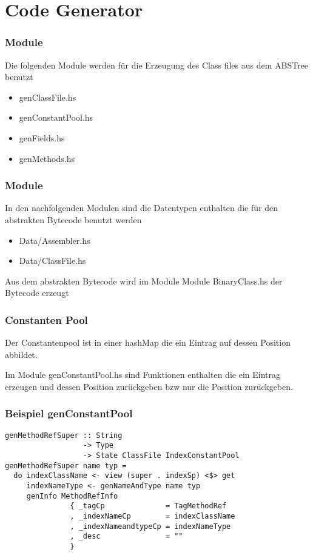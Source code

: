 \section{Code Generator}

\begin{frame}
        \frametitle{Module}
        Die folgenden Module werden für die Erzeugung des Class files aus dem ABSTree benutzt
        \begin{itemize}
                \item genClassFile.hs
                \item genConstantPool.hs
                \item genFields.hs
                \item genMethods.hs
        \end{itemize}
\end{frame}
\begin{frame}
        \frametitle{Module}
        In den nachfolgenden Modulen sind die Datentypen enthalten die für den abstrakten Bytecode benutzt werden
        \begin{itemize}
                \item Data/Assembler.hs
                \item Data/ClassFile.hs
        \end{itemize}
        Aus dem abstrakten Bytecode wird im Module Module BinaryClass.hs der Bytecode erzeugt
\end{frame}
\begin{frame}
        \frametitle{Constanten Pool}
        Der Constantenpool ist in einer hashMap die ein Eintrag auf dessen Position abbildet.

        Im Module genConstantPool.hs sind Funktionen enthalten die ein Eintrag erzeugen und dessen Position zurückgeben bzw nur die Position zurückgeben.
\end{frame}
\begin{frame}[fragile]
        \frametitle{Beispiel genConstantPool}
        \begin{lstlisting}
genMethodRefSuper :: String
                  -> Type
                  -> State ClassFile IndexConstantPool
genMethodRefSuper name typ =
  do indexClassName <- view (super . indexSp) <$> get
     indexNameType <- genNameAndType name typ
     genInfo MethodRefInfo
               { _tagCp              = TagMethodRef
               , _indexNameCp        = indexClassName
               , _indexNameandtypeCp = indexNameType
               , _desc               = ""
               }
        \end{lstlisting}
\end{frame}

